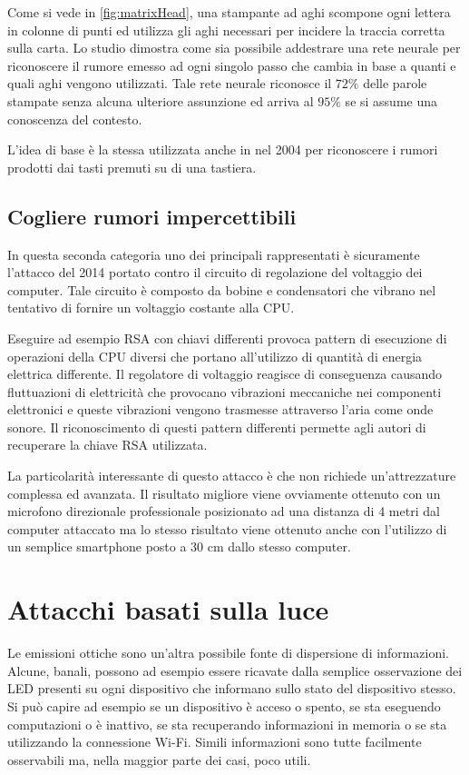 			Come si vede in \cref{fig:matrixHead}, una stampante ad aghi scompone ogni lettera in colonne di punti ed utilizza gli aghi necessari per incidere la traccia corretta sulla carta. Lo studio dimostra come sia possibile addestrare una rete neurale per riconoscere il rumore emesso ad ogni singolo passo che cambia in base a quanti e quali aghi vengono utilizzati. Tale rete neurale riconosce il $72\%$ delle parole stampate senza alcuna ulteriore assunzione ed arriva al $95\%$ se si assume una conoscenza del contesto.
			
			L'idea di base è la stessa utilizzata anche in \cite{asonov2004keyboard} nel 2004 per riconoscere i rumori prodotti dai tasti premuti su di una tastiera.
		
		\subsection{Cogliere rumori impercettibili}	
			In questa seconda categoria uno dei principali rappresentati è sicuramente l'attacco\cite{genkin2014rsa} del 2014 portato contro il circuito di regolazione del voltaggio dei computer. Tale circuito è composto da bobine e condensatori che vibrano nel tentativo di fornire un voltaggio costante alla CPU.
			
			Eseguire ad esempio RSA con chiavi differenti provoca pattern di esecuzione di operazioni della CPU diversi che portano all'utilizzo di quantità di energia elettrica differente. Il regolatore di voltaggio reagisce di conseguenza causando fluttuazioni di elettricità che provocano vibrazioni meccaniche nei componenti elettronici e queste vibrazioni vengono trasmesse attraverso l'aria come onde sonore. Il riconoscimento di questi pattern differenti permette agli autori di recuperare la chiave RSA utilizzata.
			
			La particolarità interessante di questo attacco è che non richiede un'attrezzature complessa ed avanzata. Il risultato migliore viene ovviamente ottenuto con un microfono direzionale professionale posizionato ad una distanza di 4 metri dal computer attaccato ma lo stesso risultato viene ottenuto anche con l'utilizzo di un semplice smartphone posto a 30 cm dallo stesso computer.
			
	\section{Attacchi basati sulla luce}
		Le emissioni ottiche sono un'altra possibile fonte di dispersione di informazioni. Alcune, banali, possono ad esempio essere ricavate dalla semplice osservazione dei \acs{LED} presenti su ogni dispositivo che informano sullo stato del dispositivo stesso. Si può capire ad esempio se un dispositivo è acceso o spento, se sta eseguendo computazioni o è inattivo, se sta recuperando informazioni in memoria o se sta utilizzando la connessione Wi-Fi. Simili informazioni sono tutte facilmente osservabili ma, nella maggior parte dei casi, poco utili.
		
